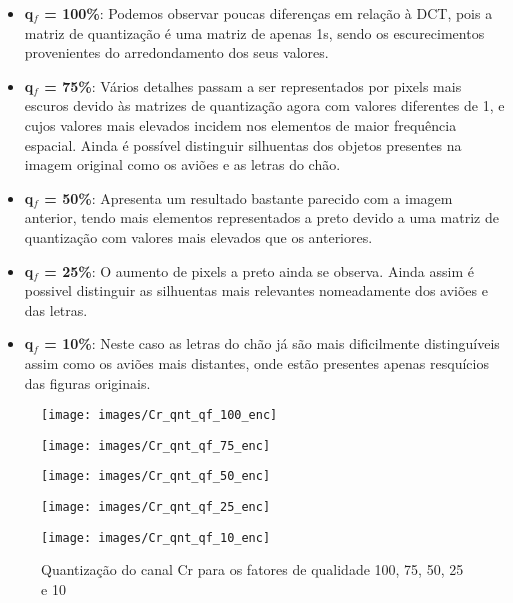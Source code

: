 \documentclass{article}
\begin{document}
\begin{itemize}
    \item \textbf{q$_f$ = 100\%}:
        Podemos observar poucas diferenças em relação à DCT, pois a matriz de quantização é uma matriz de apenas 1s, sendo os escurecimentos provenientes do arredondamento dos seus valores.
    \item \textbf{q$_f$ = 75\%}:
        Vários detalhes passam a ser representados por pixels mais escuros devido às matrizes de quantização agora com valores diferentes de 1, e cujos valores mais elevados incidem nos elementos de maior frequência espacial.
        Ainda é possível distinguir silhuentas dos objetos presentes na imagem original como os aviões e as letras do chão. 
    \item \textbf{q$_f$ = 50\%}:
        Apresenta um resultado bastante parecido com a imagem anterior, tendo mais elementos representados a preto devido a uma matriz de quantização com valores mais elevados que os anteriores.
    \item \textbf{q$_f$ = 25\%}:
        O aumento de pixels a preto ainda se observa. Ainda assim é possivel distinguir as silhuentas mais relevantes nomeadamente dos aviões e das letras.
    \item \textbf{q$_f$ = 10\%}: 
        Neste caso as letras do chão já são mais dificilmente distinguíveis assim como os aviões mais distantes, onde estão presentes apenas resquícios das figuras originais.
\end{itemize}

\begin{figure}[ht]
\centering
\begin{minipage}{.3\textwidth}
  \label{fig:qnt_Cr_100}
  \centering
  \texttt{[image: images/Cr\_qnt\_qf\_100\_enc]}
\end{minipage}%
\begin{minipage}{.3\textwidth}
  \centering
  \texttt{[image: images/Cr\_qnt\_qf\_75\_enc]}
  \label{fig:qnt_Cr_75}
\end{minipage}%
\begin{minipage}{.3\textwidth}
  \centering
  \texttt{[image: images/Cr\_qnt\_qf\_50\_enc]}
  \label{fig:qnt_Cr_50}
\end{minipage}

\medskip %

\begin{minipage}{.3\textwidth}
  \centering
  \texttt{[image: images/Cr\_qnt\_qf\_25\_enc]}
  \label{fig:qnt_Cr_25}
\end{minipage}%
\begin{minipage}{.3\textwidth}
  \centering
  \texttt{[image: images/Cr\_qnt\_qf\_10\_enc]}
  \label{fig:qnt_Cr_10}
\end{minipage}

\caption{Quantização do canal Cr para os fatores de qualidade 100, 75, 50, 25 e 10}
\label{fig:quant_figs}
\end{figure}
\end{document}
